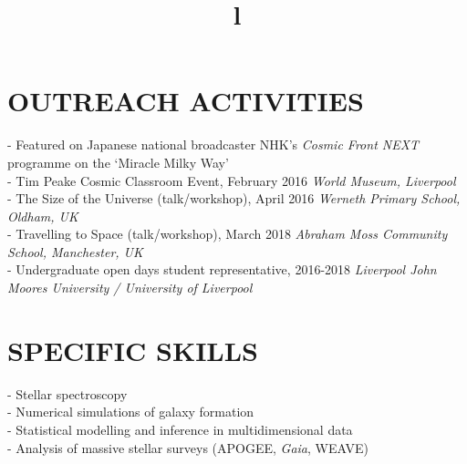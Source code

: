 \documentclass[margin]{res}
\begin{document}
\begin{resume}
\section{OUTREACH ACTIVITIES}
\par
- Featured on Japanese national broadcaster NHK's \emph{Cosmic Front NEXT} programme on the `Miracle Milky Way'\\
- Tim Peake Cosmic Classroom Event, February 2016 \emph{World Museum, Liverpool}\\
- The Size of the Universe (talk/workshop), April 2016 \emph{Werneth Primary School, Oldham, UK}\\
- Travelling to Space (talk/workshop), March 2018 \emph{Abraham Moss Community School, Manchester, UK}\\
- Undergraduate open days student representative, 2016-2018 \emph{Liverpool John Moores University / University of Liverpool}

\section{SPECIFIC SKILLS}
- Stellar spectroscopy\\
- Numerical simulations of galaxy formation\\
- Statistical modelling and inference in multidimensional data\\
- Analysis of massive stellar surveys (APOGEE, \emph{Gaia}, WEAVE) \\
\\


\begin{format}
\title{l}\\
\\
\body\\
\end{format}


\end{resume}
\end{document}
